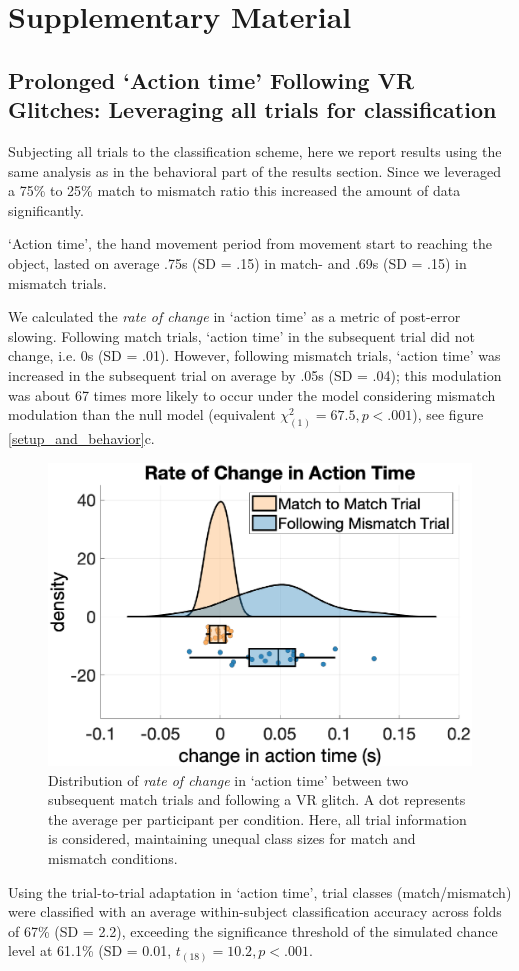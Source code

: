 \section{Supplementary Material}

\subsection{Prolonged `Action time' Following VR Glitches: Leveraging all trials for classification}

Subjecting all trials to the classification scheme, here we report results using the same analysis as in the behavioral part of the results section. Since we leveraged a 75\% to 25\% match to mismatch ratio this increased the amount of data significantly.

`Action time', the hand movement period from movement start to reaching the object, lasted on average .75s (SD = .15) in match- and .69s (SD = .15) in mismatch trials. 

We calculated the \textit{rate of change} in `action time' as a metric of post-error slowing. Following match trials, `action time' in the subsequent trial did not change, i.e. 0s (SD = .01). However, following mismatch trials, `action time' was increased in the subsequent trial on average by .05s (SD = .04); this modulation was about 67 times more likely to occur under the model considering mismatch modulation than the null model (equivalent ${\chi}^2_{(1)} = 67.5, p<.001$), see figure \ref{setup_and_behavior}c.

\begin{figure}[!h]
  \includegraphics[width=\textwidth]{figures/rate_of_change_action_time_all_trials_.eps}
  \caption{Distribution of \textit{rate of change} in `action time' between two subsequent match trials and following a VR glitch. A dot represents the average per participant per condition. Here, all trial information is considered, maintaining unequal class sizes for match and mismatch conditions.}
  \label{behavior_supplements}
\end{figure}

Using the trial-to-trial adaptation in `action time', trial classes (match/mismatch) were classified with an average within-subject classification accuracy across folds of 67\% (SD = 2.2), exceeding the significance threshold of the simulated chance level at 61.1\% (SD = 0.01, $t_{(18)} = 10.2, p < .001$.